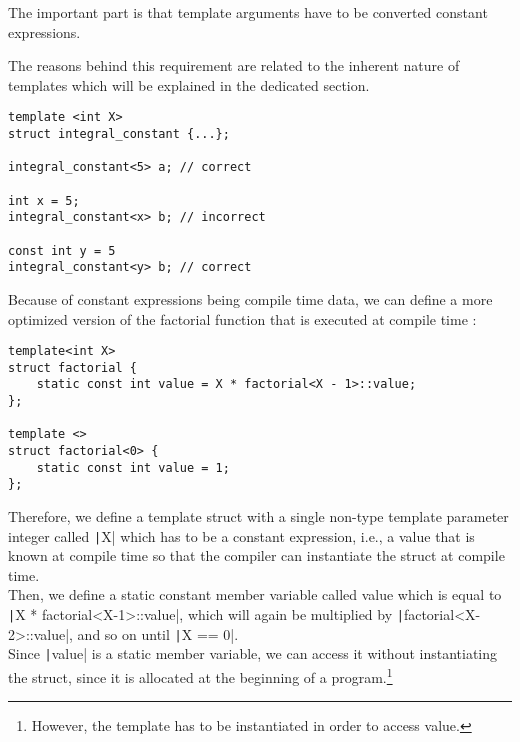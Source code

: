 \hrulefill

\begin{paracol}{2}

\vspace{30pt}

The important part is that template arguments have to be converted constant expressions. 
\vspace{10pt}

The reasons behind this requirement are related to the inherent nature of templates which will be explained in the dedicated section.

\switchcolumn

\begin{verbatim}
template <int X>
struct integral_constant {...};

integral_constant<5> a; // correct

int x = 5;
integral_constant<x> b; // incorrect

const int y = 5
integral_constant<y> b; // correct
\end{verbatim}
\end{paracol}

Because of constant expressions being compile time data, we can define a more optimized version of the factorial function that is executed at compile time :

\begin{verbatim}
template<int X>
struct factorial {
    static const int value = X * factorial<X - 1>::value;
};

template <>
struct factorial<0> {
    static const int value = 1;
};
\end{verbatim}

Therefore, we define a template struct with a single non-type template parameter integer called \texttt|X| which has to be a constant expression, i.e., a value that is known at compile time so that the compiler can instantiate the struct at compile time. \\
Then, we define a static constant member variable called value which is equal to \texttt|X * factorial<X-1>::value|, which will again be multiplied by \texttt|factorial<X-2>::value|, and so on until \texttt|X == 0|. \\
Since \texttt|value| is a static member variable, we can access it without instantiating the struct, since it is allocated at the beginning of a program.\footnote{However, the template has to be instantiated in order to access value.} \\

